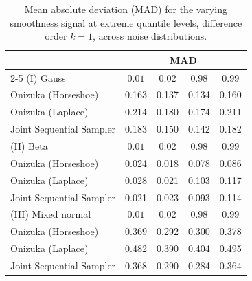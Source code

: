 \begin{table}[htbp]
\centering
\caption{Mean absolute deviation (MAD) for the varying smoothness signal at extreme quantile levels, difference order $k = 1$, across noise distributions.}
\label{tab:vs_ext_mad}
\begin{tabular}{lcccc}
\toprule
& \multicolumn{4}{c}{MAD} \\
\cmidrule(lr){2-5}
(I) Gauss & $0.01$ & $0.02$ & $0.98$ & $0.99$ \\
\midrule
Onizuka (Horseshoe)      & 0.163 & 0.137 & 0.134 & 0.160 \\
Onizuka (Laplace)        & 0.214 & 0.180 & 0.174 & 0.211 \\
Joint Sequential Sampler & 0.183 & 0.150 & 0.142 & 0.182 \\
\midrule
(II) Beta & $0.01$ & $0.02$ & $0.98$ & $0.99$ \\
\midrule
Onizuka (Horseshoe)      & 0.024 & 0.018 & 0.078 & 0.086 \\
Onizuka (Laplace)        & 0.028 & 0.021 & 0.103 & 0.117 \\
Joint Sequential Sampler & 0.021 & 0.023 & 0.093 & 0.114 \\
\midrule
(III) Mixed normal & $0.01$ & $0.02$ & $0.98$ & $0.99$ \\
\midrule
Onizuka (Horseshoe)      & 0.369 & 0.292 & 0.300 & 0.378 \\
Onizuka (Laplace)        & 0.482 & 0.390 & 0.404 & 0.495 \\
Joint Sequential Sampler & 0.368 & 0.290 & 0.284 & 0.364 \\
\bottomrule
\end{tabular}
\end{table}

